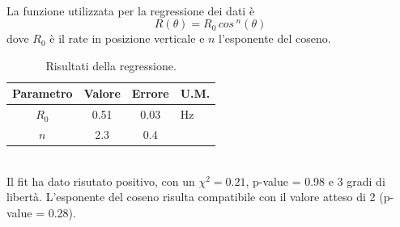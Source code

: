 \documentclass[11pt]{article} %
\begin{document}
\\La funzione utilizzata per la regressione dei dati è
\begin{equation}
R\left(\theta\right)=R_{0}\,cos\,^{n}\left(\theta\right)
\end{equation}
dove $R_0$ è il rate in posizione verticale e $n$ l'esponente del coseno.
\begin{table}[!h]
\begin{center}
\begin{tabular}{|c|c|c|l|}
\hline
\multicolumn{1}{|l|}{Parametro} & \multicolumn{1}{l|}{Valore} & \multicolumn{1}{l|}{Errore} & U.M. \\ \hline
$R_0$                               & 0.51                       & 0.03                       &    Hz \\ \hline
$n$                               & 2.3                       & 0.4                           &    \\ \hline
\end{tabular}
\end{center}
\caption{Risultati della regressione.}
\end{table}
\\Il fit ha dato risutato positivo, con un $\chi ^2 = 0.21$, p-value = 0.98 e 3 gradi di libertà. L'esponente del coseno risulta compatibile con il valore atteso di 2 (p-value = 0.28). 
\end{document}
